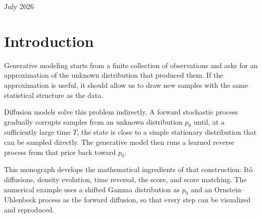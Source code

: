 \documentclass[12pt,a4paper]{report}
\theoremstyle{plain}\newtheorem{theorem}{Theorem}[chapter]\newtheorem{proposition}[theorem]{Proposition}
\theoremstyle{definition}\newtheorem{definition}[theorem]{Definition}\newtheorem{example}{Example}[chapter]
\begin{document}
\begin{titlepage}\centering\vspace*{2cm}{\Large University of Buenos Aires\par}\vspace{3cm}{\Huge\bfseries Score-based generative modeling through stochastic differential equations\par}\vspace{2cm}{\large Author: Gonzalo Josué Spina\par}\vfill{\large July 2026\par}\end{titlepage}
\tableofcontents\clearpage
\chapter{Introduction}
Generative modeling starts from a finite collection of observations and asks for an approximation of the unknown distribution that produced them. If the approximation is useful, it should allow us to draw new samples with the same statistical structure as the data.

Diffusion models solve this problem indirectly. A forward stochastic process gradually corrupts samples from an unknown distribution $p_0$ until, at a sufficiently large time $T$, the state is close to a simple stationary distribution that can be sampled directly. The generative model then runs a learned reverse process from that prior back toward $p_0$.

This monograph develops the mathematical ingredients of that construction: Itô diffusions, density evolution, time reversal, the score, and score matching. The numerical example uses a shifted Gamma distribution as $p_0$ and an Ornstein--Uhlenbeck process as the forward diffusion, so that every step can be visualized and reproduced.
\end{document}
